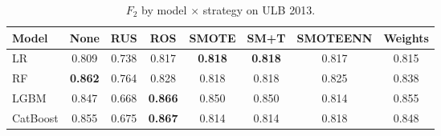 \begin{table}[ht]
\centering
\caption{$F_2$ by model $\times$ strategy on ULB 2013.}
\label{tab:factorial_ulb_f2}
\begin{tabular}{l c c c c c c c}
\toprule
Model & None & RUS & ROS & SMOTE & SM+T & SMOTEENN & Weights \\
\midrule
LR         & 0.809 & 0.738 & 0.817 & \textbf{0.818} & \textbf{0.818} & 0.817 & 0.815 \\
RF         & \textbf{0.862} & 0.764 & 0.828 & 0.818 & 0.818 & 0.825 & 0.838 \\
LGBM       & 0.847 & 0.668 & \textbf{0.866} & 0.850 & 0.850 & 0.814 & 0.855 \\
CatBoost   & 0.855 & 0.675 & \textbf{0.867} & 0.814 & 0.814 & 0.818 & 0.848 \\
\bottomrule
\end{tabular}
\end{table}